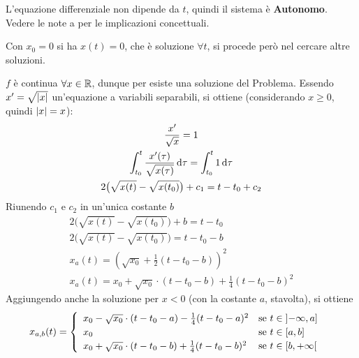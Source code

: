 \begin{example}
\begin{solution}
\begin{figure}[H]
		\end{figure}
		\begin{note}
			L'equazione differenziale non dipende da $t$, quindi il sistema è \textbf{Autonomo}. Vedere le note a  per le implicazioni concettuali.
		\end{note}
		\begin{note}
			Con $x_0 = 0$ si ha $x(t)=0$, che è soluzione $\forall t$, si procede però nel cercare altre soluzioni.
		\end{note}
		$f$ è continua $\forall x \in \mathbb{R}$, dunque per  esiste una soluzione del Problema. Essendo $x' = \sqrt{\left|x\right|}$ un'equazione a variabili separabili, si ottiene (considerando $x \geq 0$, quindi $\left|x\right| = x$):
		\begin{equation*}
			\begin{gathered}
				\frac{x'}{\sqrt{x}} = 1\\
				\int_{t_0}^{t}{\frac{x'(\tau)}{\sqrt{x(\tau)}}\,\mathrm{d}{\tau}} = \int_{t_0}^{t} 1 \,\mathrm{d}{\tau}\\
				2\bigl(\sqrt{x(t)} - \sqrt{x(t_0)}\bigr) + c_1 = t - t_0 + c_2\\
			\end{gathered}
		\end{equation*}
		Riunendo $c_1$ e $c_2$ in un'unica costante $b$
		\begin{gather*}
			2\bigl(\sqrt{x(t)} - \sqrt{x(t_0)}\bigr) + b = t - t_0\\
			2\bigl(\sqrt{x(t)} - \sqrt{x(t_0)}\bigr) = t - t_0 - b\\
			x_a(t) = \left( \sqrt{x_0} + \frac{1}{2}(t-t_0-b) \right)^2\\
			x_a(t) = x_0 + \sqrt{x_0} \cdot (t-t_0-b) + \frac{1}{4}(t-t_0-b)^2
		\end{gather*}
		Aggiungendo anche la soluzione per $x < 0$ (con la costante $a$, stavolta), si ottiene
		\begin{equation*}
			x_{a,b}(t) =
			\begin{cases}
				\begin{array}{ll}
					x_0 - \sqrt{x_0} \cdot (t-t_0-a) - \frac{1}{4}(t-t_0-a)^2 & \text{se } t \in \left]-\infty,a\right]\\
					x_0 & \text{se } t \in \left[a,b\right]\\
					x_0 + \sqrt{x_0} \cdot (t-t_0-b) + \frac{1}{4}(t-t_0-b)^2 & \text{se } t \in \left[b,+\infty\right[
				\end{array}

\end{cases}
\end{equation*}
\end{solution}
\end{example}
